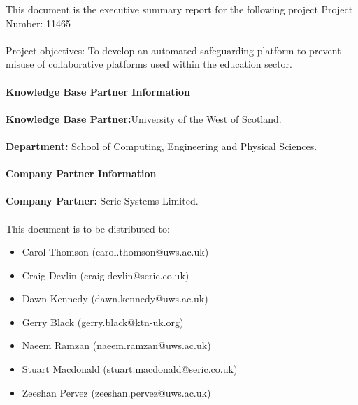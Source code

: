 \maketitle
This document is the executive summary report for the following project
Project Number: 11465
\\\\
Project objectives: To develop an automated safeguarding platform to prevent misuse of collaborative platforms used within the education sector.
\\\\
\textbf{Knowledge Base Partner Information}
\\\\
\textbf{Knowledge Base Partner:}University of the West of Scotland.
\\\\
\textbf{Department:}	School of Computing, Engineering and Physical Sciences.
\\\\
\textbf{Company Partner Information}
\\\\
 \textbf{Company Partner:} Seric Systems Limited.
\\\\
This document is to be distributed to:
\begin{itemize}

    \item Carol Thomson (carol.thomson@uws.ac.uk)
    \item Craig Devlin (craig.devlin@seric.co.uk)
    \item Dawn Kennedy (dawn.kennedy@uws.ac.uk)
    \item Gerry Black (gerry.black@ktn-uk.org)
    \item Naeem Ramzan (naeem.ramzan@uws.ac.uk)
    \item Stuart Macdonald (stuart.macdonald@seric.co.uk)
    \item Zeeshan Pervez (zeeshan.pervez@uws.ac.uk)
\end{itemize}
